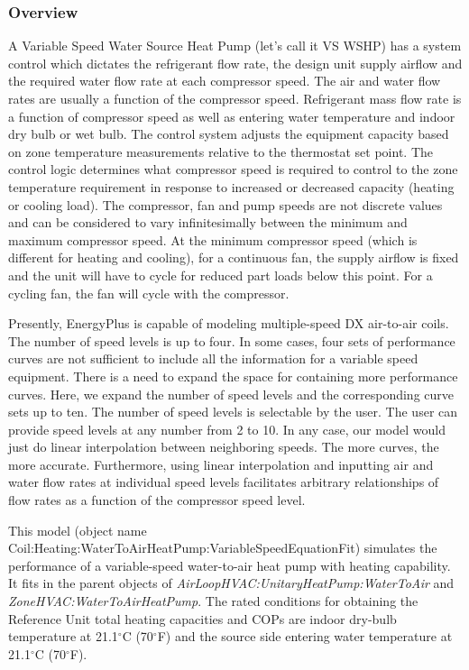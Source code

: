 \subsubsection{Overview}\label{overview-13}

A Variable Speed Water Source Heat Pump (let's call it VS WSHP) has a system control which dictates the refrigerant flow rate, the design unit supply airflow and the required water flow rate at each compressor speed. The air and water flow rates are usually a function of the compressor speed. Refrigerant mass flow rate is a function of compressor speed as well as entering water temperature and indoor dry bulb or wet bulb. The control system adjusts the equipment capacity based on zone temperature measurements relative to the thermostat set point. The control logic determines what compressor speed is required to control to the zone temperature requirement in response to increased or decreased capacity (heating or cooling load). The compressor, fan and pump speeds are not discrete values and can be considered to vary infinitesimally between the minimum and maximum compressor speed. At the minimum compressor speed (which is different for heating and cooling), for a continuous fan, the supply airflow is fixed and the unit will have to cycle for reduced part loads below this point. For a cycling fan, the fan will cycle with the compressor.

Presently, EnergyPlus is capable of modeling multiple-speed DX air-to-air coils. The number of speed levels is up to four. In some cases, four sets of performance curves are not sufficient to include all the information for a variable speed equipment. There is a need to expand the space for containing more performance curves. Here, we expand the number of speed levels and the corresponding curve sets up to ten. The number of speed levels is selectable by the user. The user can provide speed levels at any number from 2 to 10. In any case, our model would just do linear interpolation between neighboring speeds. The more curves, the more accurate. Furthermore, using linear interpolation and inputting air and water flow rates at individual speed levels facilitates arbitrary relationships of flow rates as a function of the compressor speed level.

This model (object name Coil:Heating:WaterToAirHeatPump:VariableSpeedEquationFit) simulates the performance of a variable-speed water-to-air heat pump with heating capability. It fits in the parent objects of \emph{AirLoopHVAC:UnitaryHeatPump:WaterToAir} and \emph{ZoneHVAC:WaterToAirHeatPump}. The rated conditions for obtaining the Reference Unit total heating capacities and COPs are indoor dry-bulb temperature at 21.1\(^{\circ}\)C (70\(^{\circ}\)F) and the source side entering water temperature at 21.1\(^{\circ}\)C (70\(^{\circ}\)F).

